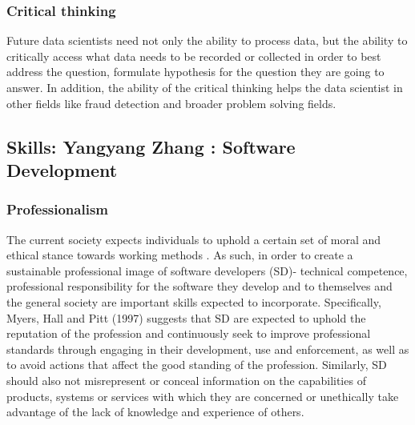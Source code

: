 \documentclass[a4paper, 11pt]{report}
\begin{document}
\subsubsection{Critical thinking}
Future data scientists need not only the ability to process data, but the ability to critically access what data needs to be recorded or collected in order to best address the question, formulate hypothesis for the question they are going to answer. In addition, the ability of the critical thinking helps the data scientist in other fields like fraud detection and broader problem solving fields. 

\subsection{Skills: Yangyang Zhang : Software Development}

\subsubsection{Professionalism}
The current society expects individuals to uphold a certain set of moral and ethical stance towards working methods \cite{myers2012responsible}. As such, in order to create a sustainable professional image of software developers (SD)- technical competence, professional responsibility for the software they develop and to themselves and the general society are important skills expected to incorporate. Specifically, Myers, Hall and Pitt (1997) suggests that SD are expected to uphold the reputation of the profession and continuously seek to improve professional standards through engaging in their development, use and enforcement, as well as to avoid actions that affect the good standing of the profession. Similarly, SD should also not misrepresent or conceal information on the capabilities of products, systems or services with which they are concerned or unethically take advantage of the lack of knowledge and experience of others. 
 
\end{document}

